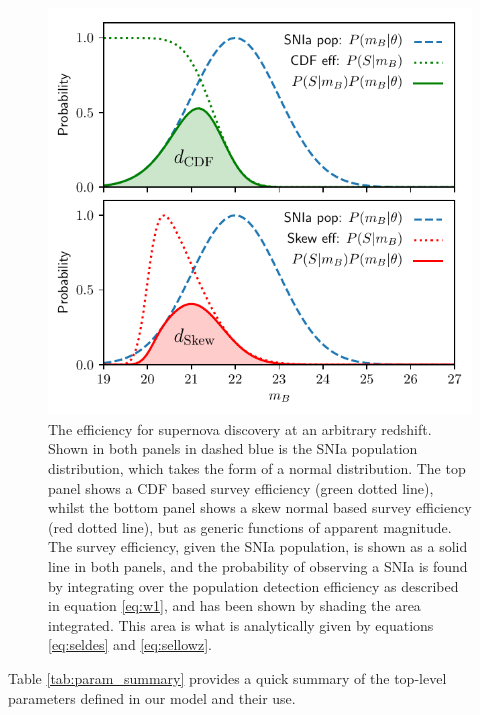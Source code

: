 \documentclass[a4paper,fleqn,usenatbib]{mnras}
\begin{document}
\begin{figure}
	\begin{center}
		\includegraphics[width=\columnwidth]{efficiency.pdf}
	\end{center}
	\caption{The efficiency for supernova discovery at an arbitrary redshift. Shown in both panels in dashed blue is the SNIa population distribution, which takes the form of a normal distribution. The top panel shows a CDF based survey efficiency (green dotted line), whilst the bottom panel shows a skew normal based survey efficiency (red dotted line), but as generic functions of apparent magnitude. The survey efficiency, given the SNIa population, is shown as a solid line in both panels, and the probability of observing a SNIa is found by integrating over the population detection efficiency as described in equation \eqref{eq:w1}, and has been shown by shading the area integrated. This area is what is analytically given by equations \eqref{eq:seldes} and \eqref{eq:sellowz}.}
	\label{fig:efficiency}
\end{figure}

Table \ref{tab:param_summary} provides a quick summary of the top-level parameters defined in our model and their use.
\end{document}
